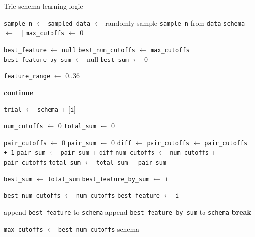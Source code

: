 \documentclass[5p,final]{elsarticle}
\begin{document}
\begin{algorithm}[H]
	\caption{Trie schema-learning logic}
	\begin{algorithmic}

		\State \texttt{sample\_n} $\gets$ 
		\State \texttt{sampled\_data} $\gets$ randomly sample
		\texttt{sample\_n} from \texttt{data}
		\State \texttt{schema} $\gets$ [ ]
		\State \texttt{max\_cutoffs} $\gets$ $0$

		\Loop
		\State \texttt{best\_feature} $\gets$ \texttt{null}
		\State \texttt{best\_num_cutoffs} $\gets$ \texttt{max\_cutoffs}
		\State \texttt{best\_feature\_by\_sum} $\gets$ null
		\State \texttt{best\_sum} $\gets$ $0$

		\State \texttt{feature\_range} $\gets$ 0..36 

		\State \textbf{continue}
		\EndIf

		\State \texttt{trial} $\gets$ \texttt{schema} + [\texttt{i}]

		\State \texttt{num\_cutoffs} $\gets$ 0
		\State \texttt{total\_sum} $\gets$ 0

		\State \texttt{pair\_cutoffs} $\gets$ 0
		\State \texttt{pair\_sum} $\gets$ 0
		\State \texttt{diff} $\gets$ 
		\State \texttt{pair\_cutoffs} $\gets$ \texttt{pair\_cutoffs + 1}
		\EndIf
		\State \texttt{pair\_sum} $\gets$ \texttt{pair\_sum} + \texttt{diff}
		\EndFor
		\State \texttt{num\_cutoffs} $\gets$ \texttt{num\_cutoffs} +
		\texttt{pair\_cutoffs}
		\State \texttt{total\_sum} $\gets$ \texttt{total\_sum} + \texttt{pair\_sum}
		\EndFor

		\State \texttt{best\_sum} $\gets$ \texttt{total\_sum}
		\State \texttt{best\_feature\_by\_sum} $\gets$ \texttt{i}
		\EndIf

		\State \texttt{best\_num_cutoffs} $\gets$ \texttt{num\_cutoffs}
		\State \texttt{best\_feature} $\gets$ \texttt{i}
		\EndIf
		\EndFor

		\State append \texttt{best\_feature} to \texttt{schema}
		\State append \texttt{best\_feature\_by\_sum} to \texttt{schema}
		\Else
		\State \textbf{break}
		\EndIf

		\State \texttt{max\_cutoffs} $\gets$ \texttt{best\_num_cutoffs}
		\EndLoop
		\State \Return schema
		\EndFunction
	\end{algorithmic}
\end{algorithm}
\end{document}
